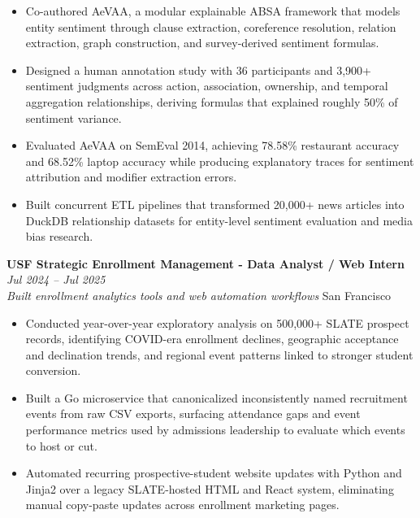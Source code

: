 \documentclass[a4paper,11pt]{article}
\newcommand{\resumeSubheading}[4]{%
\vspace{1mm}
\textbf{#1} \hfill \textit{\footnotesize #4} \\
\textit{\footnotesize #3} \hfill \footnotesize #2
\vspace{1mm}
}
\begin{document}
\begin{itemize}[leftmargin=0.35in, itemsep=0.5mm]

\item Co-authored AeVAA, a modular explainable ABSA framework that models entity sentiment through clause extraction, coreference resolution, relation extraction, graph construction, and survey-derived sentiment formulas.
\vspace{-.45mm}

\item Designed a human annotation study with 36 participants and 3,900+ sentiment judgments across action, association, ownership, and temporal aggregation relationships, deriving formulas that explained roughly 50\% of sentiment variance.
\vspace{-.45mm}

\item Evaluated AeVAA on SemEval 2014, achieving 78.58\% restaurant accuracy and 68.52\% laptop accuracy while producing explanatory traces for sentiment attribution and modifier extraction errors.

\vspace{-.45mm}

\item Built concurrent ETL pipelines that transformed 20,000+ news articles into DuckDB relationship datasets for entity-level sentiment evaluation and media bias research.

\end{itemize}

\vspace{-3mm}

\resumeSubheading
{USF Strategic Enrollment Management - Data Analyst / Web Intern}{San Francisco}
{Built enrollment analytics tools and web automation workflows}{Jul 2024 -- Jul 2025}
\vspace{-3mm}

\begin{itemize}[leftmargin=0.35in, itemsep=0.5mm]

\item Conducted year-over-year exploratory analysis on 500,000+ SLATE prospect records, identifying COVID-era enrollment declines, geographic acceptance and declination trends, and regional event patterns linked to stronger student conversion.

\vspace{-.45mm}

\item Built a Go microservice that canonicalized inconsistently named recruitment events from raw CSV exports, surfacing attendance gaps and event performance metrics used by admissions leadership to evaluate which events to host or cut.

\vspace{-.45mm}

\item Automated recurring prospective-student website updates with Python and Jinja2 over a legacy SLATE-hosted HTML and React system, eliminating manual copy-paste updates across enrollment marketing pages.

\end{itemize}
\end{document}
